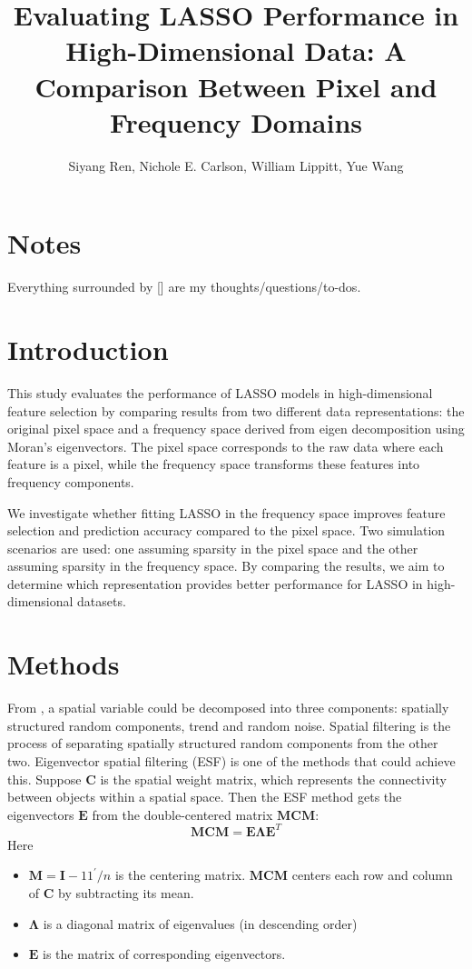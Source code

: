 \documentclass[12pt]{article}
\begin{document}
\title{Evaluating LASSO Performance in High-Dimensional Data: A Comparison Between Pixel and Frequency Domains}
\author{Siyang Ren, Nichole E. Carlson, William Lippitt, Yue Wang}
\date{}
\maketitle


\section*{Notes}

Everything surrounded by [] are my thoughts/questions/to-dos.


\section*{Introduction}

This study evaluates the performance of LASSO models in high-dimensional feature selection by comparing results from two different data representations: the original pixel space and a frequency space derived from eigen decomposition using Moran’s eigenvectors. The pixel space corresponds to the raw data where each feature is a pixel, while the frequency space transforms these features into frequency components.

We investigate whether fitting LASSO in the frequency space improves feature selection and prediction accuracy compared to the pixel space. Two simulation scenarios are used: one assuming sparsity in the pixel space and the other assuming sparsity in the frequency space. By comparing the results, we aim to determine which representation provides better performance for LASSO in high-dimensional datasets.


\section*{Methods}

From \cite{Griffith_Chun_2014}, a spatial variable could be decomposed into three components: spatially structured random components, trend and random noise. Spatial filtering is the process of separating spatially structured random components from the other two. Eigenvector spatial filtering (ESF) is one of the methods that could achieve this. Suppose \( \mathbf{C} \) is the spatial weight matrix, which represents the connectivity between objects within a spatial space. Then the ESF method gets the eigenvectors \( \mathbf{E} \) from the double-centered matrix \( \mathbf{MCM} \):
\[
  \mathbf{M C M}=\mathbf{E} \boldsymbol{\Lambda} \mathbf{E}^{T}
\]
Here
\begin{itemize}
  \item \( \mathbf{M}=\mathbf{I}-11^{\prime} / n \) is the centering matrix. \( \mathbf{MCM} \) centers each row and column of \( \mathbf{C} \) by subtracting its mean.
  \item \( \boldsymbol{\Lambda} \) is a diagonal matrix of eigenvalues (in descending order)
  \item \( \mathbf{E} \) is the matrix of corresponding eigenvectors.
\end{itemize}
\end{document}
